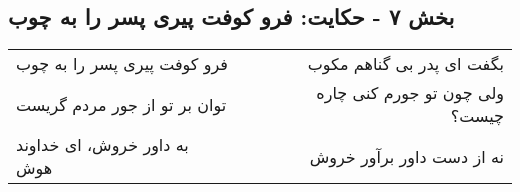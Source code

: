 \begin{center}
\section*{بخش ۷ - حکایت: فرو کوفت پیری پسر را به چوب}
\label{sec:007}
\begin{longtable}{l p{0.5cm} r}
فرو کوفت پیری پسر را به چوب
&&
بگفت ای پدر بی گناهم مکوب
\\
توان بر تو از جور مردم گریست
&&
ولی چون تو جورم کنی چاره چیست؟
\\
به داور خروش، ای خداوند هوش
&&
نه از دست داور برآور خروش
\\
\end{longtable}
\end{center}
